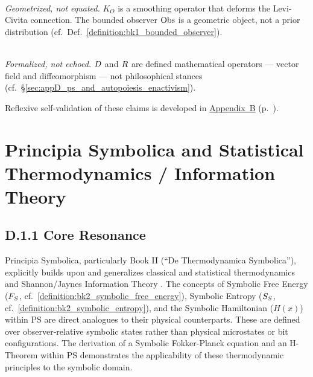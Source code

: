 \begin{tcolorbox}
\begin{description}[leftmargin=0pt, itemsep=6pt]
    \item[\textbf{Bayesian Inference}] \hfill \\
    \textit{Geometrized, not equated.}
    $K_O$ is a smoothing operator that deforms the Levi-Civita connection.
    The bounded observer $\mathrm{Obs}$ is a geometric object, not a prior distribution
    (cf.~Def.~\ref{definition:bk1_bounded_observer}).

    \item[\textbf{Enactivism / Autopoiesis}] \hfill \\
    \textit{Formalized, not echoed.}
    $D$ and $R$ are defined mathematical operators --- vector field and diffeomorphism ---
    not philosophical stances (cf.~\S\ref{sec:appD_ps_and_autopoiesis_enactivism}).
\end{description}

\medskip
\noindent Reflexive self-validation of these claims is developed in
\hyperref[sec:appB_overview]{Appendix~B} (p.~\pageref{sec:appB_overview}).
\end{tcolorbox}

\section*{Principia Symbolica and Statistical Thermodynamics / Information Theory}
\label{sec:appD_ps_and_stat_thermo_info_theory}
\subsection*{D.1.1 Core Resonance}
\label{subsec:appD_core_resonance}
Principia Symbolica, particularly Book II (``De Thermodynamica Symbolica''), explicitly builds upon and generalizes classical and statistical thermodynamics \cite{callen1985thermodynamics} and Shannon/Jaynes Information Theory \cite{shannon1948}. The concepts of Symbolic Free Energy (\(F_S\), cf.~\ref{definition:bk2_symbolic_free_energy}), Symbolic Entropy (\(S_S\), cf.~\ref{definition:bk2_symbolic_entropy}), and the Symbolic Hamiltonian (\(H(x)\)) within PS are direct analogues to their physical counterparts. These are defined over observer-relative symbolic states rather than physical microstates or bit configurations. The derivation of a Symbolic Fokker-Planck equation and an H-Theorem within PS demonstrates the applicability of these thermodynamic principles to the symbolic domain.
